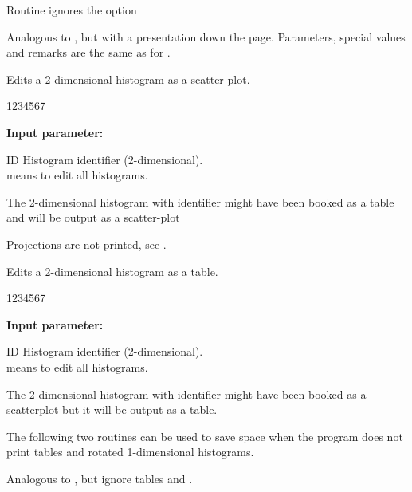 Routine  ignores the option
 
 
\Action
Analogous to , but with a presentation down the page.
Parameters, special values and remarks are the same as for .
 
 
\Action
Edits a 2-dimensional histogram as a scatter-plot.
 
\begin{DLtt}{1234567}
\item[{\rm\bf Input parameter:}]
\item[ID] Histogram identifier (2-dimensional).     \\
 means to edit all histograms.
\end{DLtt}
 
\Remark
 
\begin{UL}
\item The 2-dimensional histogram with identifier 
might have been booked as a table and will be output
as a scatter-plot
\item Projections are not printed, see .
\end{UL}
 
 
\Action
Edits a 2-dimensional histogram as a table.
 
\begin{DLtt}{1234567}
\item[{\rm\bf Input parameter:}]
\item[ID] Histogram identifier (2-dimensional).     \\
 means to edit all histograms.
\end{DLtt}
 
\Remark
 
\begin{UL}
\item The 2-dimensional histogram with identifier 
might have been booked as a scatterplot but it
will be output as a table.
\end{UL}
 
The following two routines can be used to save space when the program
does not print tables and rotated 1-dimensional histograms.
 
 
\Action
Analogous to
, but ignore tables and .
 
